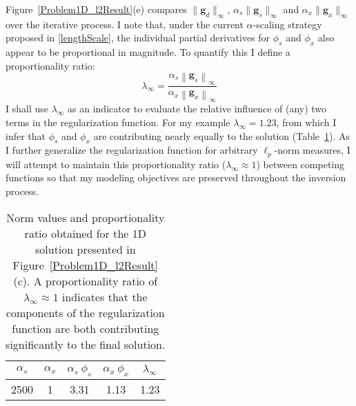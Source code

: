 Figure~\ref{Problem1D_l2Result}(e) compares $\|\mathbf{g}_d\|_\infty$, $\alpha_s \|\mathbf{g}_s\|_\infty$ and $\alpha_x \|\mathbf{g}_x\|_\infty$ over the iterative process. I note that, under the current $\alpha$-scaling strategy proposed in \eqref{lengthScale}, the individual partial derivatives for $\phi_s$ and $\phi_x$ also appear to be proportional in magnitude.
To quantify this I define a proportionality ratio:
\begin{equation}\label{derivRatio}
\lambda_\infty = \frac{ \alpha_s \left\|\mathbf{g}_s \right\|_\infty}{\alpha_x \left\| \mathbf{g}_x \right\|_\infty}
\end{equation}
I shall use $\lambda_\infty$ as an indicator to evaluate the relative influence of (any) two terms in the regularization function.
For my example $\lambda_\infty = 1.23$, from which I infer that $\phi_s$ and $\phi_x$ are contributing nearly equally to the solution (Table~\ref{PropRatio}). As I further generalize the regularization function for arbitrary $\ell_p$-norm measures, I will attempt to maintain this proportionality ratio ($\lambda_\infty \approx 1$) between competing functions so that my modeling objectives are preserved throughout the inversion process.
\begin{table}
\centering
\begin{tabular}{| c|c | c | c| c|} \hline
$\alpha_s$&$\alpha_x$ & $\alpha_s\:\phi_s$ & $\alpha_x\:\phi_x$ & $\lambda_{\infty}$ \\ \hline
2500& 1& 3.31& 1.13& 1.23\\
\hline
\end{tabular}
\caption{Norm values and proportionality ratio obtained for the 1D solution presented in Figure~\ref{Problem1D_l2Result}(c). A proportionality ratio of $\lambda_\infty \approx 1$ indicates that the components of the regularization function are both contributing significantly to the final solution.}
\label{PropRatio}
\end{table}

